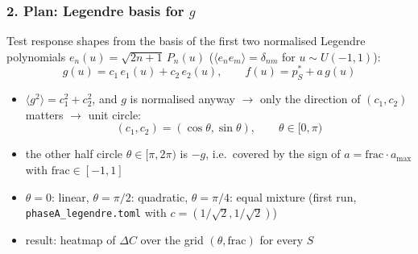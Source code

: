\subsubsection*{2. Plan: Legendre basis for $g$}
\label{sec:rq2-legendre-plan}
Test response shapes from the basis of the first two normalised Legendre polynomials
$e_n(u) = \sqrt{2n + 1}\, P_n(u)$ ($\langle e_n e_m \rangle = \delta_{nm}$ for $u \sim U(-1, 1)$):
\begin{equation*}
    g(u) = c_1\, e_1(u) + c_2\, e_2(u), \qquad f(u) = p^*_S + a\, g(u)
\end{equation*}
\begin{itemize}
    \item $\langle g^2 \rangle = c_1^2 + c_2^2$, and $g$ is normalised anyway $\to$ only the direction of
    $(c_1, c_2)$ matters $\to$ unit circle:
    \begin{equation*}
        (c_1, c_2) = (\cos\theta, \sin\theta), \qquad \theta \in [0, \pi)
    \end{equation*}
    \item the other half circle $\theta \in [\pi, 2\pi)$ is $-g$, i.e.\ covered by the sign of
    $a = \text{frac} \cdot a_{\max}$ with $\text{frac} \in [-1, 1]$
    \item $\theta = 0$: linear, $\theta = \pi/2$: quadratic, $\theta = \pi/4$: equal mixture (first run,
    \texttt{phaseA\_legendre.toml} with $c = (1/\sqrt{2}, 1/\sqrt{2})$)
    \item result: heatmap of $\Delta C$ over the grid $(\theta, \text{frac})$ for every $S$
\end{itemize}

